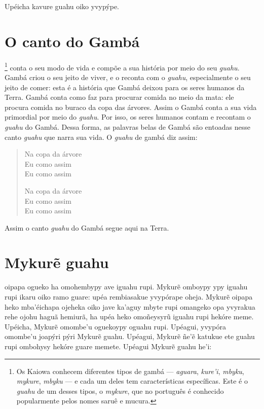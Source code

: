 Upéicha kavure guahu oiko yvypýpe.

\chapter{O canto do Gambá}

\footnote{Os Kaiowa conhecem diferentes tipos de gambá ---
  \textit{aguara}, \textit{kure'i}, \textit{mbyku}, \textit{mykure},
  \textit{mbyku} --- e cada um deles tem características específicas. Este é
  o \textit{guahu} de um desses tipos, o \textit{mykure}, que no português é
  conhecido popularmente pelos nomes saruê e mucura.} conta o seu modo
de vida e compõe a sua história por meio do seu \textit{guahu}. Gambá
criou o seu jeito de viver, e o reconta com o \textit{guahu},
especialmente o seu jeito de comer: esta é a história que Gambá deixou
para os seres humanos da Terra. Gambá conta como faz para procurar
comida no meio da mata: ele procura comida no buraco da copa das
árvores. Assim o Gambá conta a sua vida primordial por meio do
\textit{guahu}. Por isso, os seres humanos contam e recontam o
\textit{guahu} do Gambá. Dessa forma, as palavras belas de Gambá são
entoadas nesse canto \textit{guahu} que narra sua vida. O \textit{guahu} de
gambá diz assim:

\begin{verse}
Na copa da árvore\\
Eu como assim\\
Eu como assim

Na copa da árvore\\
Eu como assim\\
Eu como assim
\end{verse}

Assim o canto \textit{guahu} do Gambá segue aqui na Terra.

\chapter{Mykurẽ guahu}

 oipapa ogueko ha omohembypy ave iguahu rupi. Mykurẽ omboypy ypy
iguahu rupi ikaru oiko ramo guare: upéa rembiasakue yvypórape oheja.
Mykurẽ oipapa heko mba'éichapa ojeheka oiko jave ka'aguy mbyte rupi
omangeko opa yvyrakua rehe ojohu haguã hemiurã, ha upéa heko omoñeysyrũ
iguahu rupi hekóre meme. Upéicha, Mykurẽ omombe'u oguekoypy oguahu rupi.
Upéagui, yvypóra omombe'u joapýri pýri Mykurẽ guahu. Upéagui, Mykurẽ
ñe'ẽ katukue ete guahu rupi ombohysy hekóre guare memete. Upéagui Mykurẽ
guahu he'i:

